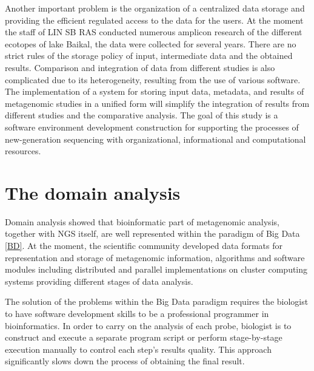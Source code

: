 \documentclass[conference,a4paper]{IEEEtran}
\begin{document}
Another important problem is the organization of a centralized data storage and providing the efficient regulated access to the data for the users.  At the moment the staff of LIN SB RAS conducted numerous amplicon research of the different ecotopes of lake Baikal, the data were collected for several years.  There are no strict rules of the storage policy of input, intermediate data and the obtained results.  Comparison and integration of data from different studies is also complicated due to its heterogeneity, resulting from the use of various software.  The implementation of a system for storing input data, metadata, and results of metagenomic studies in a unified form will simplify the integration of results from different studies and the comparative analysis.
 The goal of this study is a software environment development construction for supporting the processes of new-generation sequencing with organizational, informational and computational resources.

\section{The domain analysis}
\label{sec:doma}

Domain analysis showed that bioinformatic part of metagenomic analysis, together with NGS itself, are well represented within the paradigm of Big Data \ref{BD}.  At the moment, the scientific community developed data formats for representation and storage of metagenomic information, algorithms and software modules including distributed and parallel implementations on cluster computing systems providing different stages of data analysis.

The solution of the problems within the Big Data paradigm requires the biologist to have software development skills to be a professional programmer in bioinformatics.  In order to carry on the analysis of each probe, biologist is to construct and execute a separate program script or perform stage-by-stage execution manually to control each step's results quality.  This approach significantly slows down the process of obtaining the final result.
\end{document}

